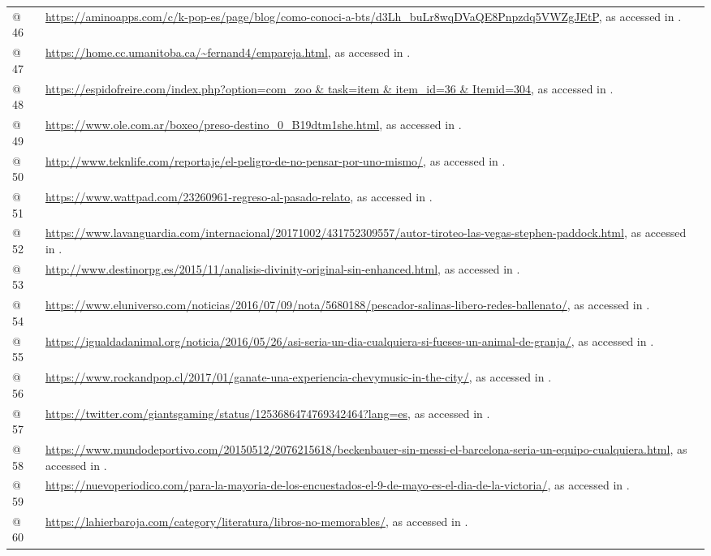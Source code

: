 \begin{tabularx}{\textwidth}{XX}
@ 46 & \url{https://aminoapps.com/c/k-pop-es/page/blog/como-conoci-a-bts/d3Lh_buLr8wqDVaQE8Pnpzdq5VWZgJEtP}, as accessed in \citealt{June2021}.\\
@ 47 & \url{https://home.cc.umanitoba.ca/~fernand4/empareja.html}, as accessed in \citealt{Februar2021}.\\
@ 48 & \url{https://espidofreire.com/index.php?option=com_zoo & task=item & item_id=36 & Itemid=304}, as accessed in \citealt{Februar2021}.\\
@ 49 & \url{https://www.ole.com.ar/boxeo/preso-destino_0_B19dtm1she.html}, as accessed in \citealt{Februar2021}.\\
@ 50 & \url{http://www.teknlife.com/reportaje/el-peligro-de-no-pensar-por-uno-mismo/}, as accessed in \citealt{June2021}.\\
@ 51 & \url{https://www.wattpad.com/23260961-regreso-al-pasado-relato}, as accessed in \citealt{Februar2021}.\\
@ 52 & \url{https://www.lavanguardia.com/internacional/20171002/431752309557/autor-tiroteo-las-vegas-stephen-paddock.html}, as accessed in \citealt{Februar2021}.\\
@ 53 & \url{http://www.destinorpg.es/2015/11/analisis-divinity-original-sin-enhanced.html}, as accessed in \citealt{June2021}.\\
@ 54 & \url{https://www.eluniverso.com/noticias/2016/07/09/nota/5680188/pescador-salinas-libero-redes-ballenato/}, as accessed in \citealt{Februar2021}.\\
@ 55 & \url{https://igualdadanimal.org/noticia/2016/05/26/asi-seria-un-dia-cualquiera-si-fueses-un-animal-de-granja/}, as accessed in \citealt{June2021}.\\
@ 56 & \url{https://www.rockandpop.cl/2017/01/ganate-una-experiencia-chevymusic-in-the-city/}, as accessed in \citealt{Februar2012}.\\
@ 57 & \url{https://twitter.com/giantsgaming/status/1253686474769342464?lang=es}, as accessed in \citealt{June2021}.\\
@ 58 & \url{https://www.mundodeportivo.com/20150512/2076215618/beckenbauer-sin-messi-el-barcelona-seria-un-equipo-cualquiera.html}, as accessed in \citealt{Februar2021}.\\
@ 59 & \url{https://nuevoperiodico.com/para-la-mayoria-de-los-encuestados-el-9-de-mayo-es-el-dia-de-la-victoria/}, as accessed in \citealt{June2021}.\\
@ 60 & \url{https://lahierbaroja.com/category/literatura/libros-no-memorables/}, as accessed in \citealt{June2021}.\\

\end{tabularx}

